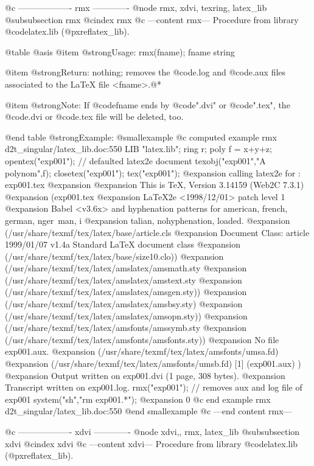 {{{@c ------------------- rmx -------------
@node rmx, xdvi, texring, latex_lib
@subsubsection rmx
@cindex rmx
@c ---content rmx---
Procedure from library @code{latex.lib} (@pxref{latex_lib}).

@table @asis
@item @strong{Usage:}
rmx(fname); fname string

@item @strong{Return:}
nothing; removes the @code{.log} and @code{.aux} files associated to
the LaTeX file <fname>.@*

@item @strong{Note:}
If @code{fname} ends by @code{".dvi"} or @code{".tex"}, the
@code{.dvi} or @code{.tex} file will be deleted, too.

@end table
@strong{Example:}
@smallexample
@c computed example rmx d2t_singular/latex_lib.doc:550 
LIB "latex.lib";
ring r;
poly f = x+y+z;
opentex("exp001");              // defaulted latex2e document
texobj("exp001","A polynom",f);
closetex("exp001");
tex("exp001");
@expansion{} calling  latex2e  for : exp001.tex 
@expansion{} 
@expansion{} This is TeX, Version 3.14159 (Web2C 7.3.1)
@expansion{} (exp001.tex
@expansion{} LaTeX2e <1998/12/01> patch level 1
@expansion{} Babel <v3.6x> and hyphenation patterns for american, french, german, nger\
   man, i
@expansion{} talian, nohyphenation, loaded.
@expansion{} (/usr/share/texmf/tex/latex/base/article.cls
@expansion{} Document Class: article 1999/01/07 v1.4a Standard LaTeX document class
@expansion{} (/usr/share/texmf/tex/latex/base/size10.clo))
@expansion{} (/usr/share/texmf/tex/latex/amslatex/amsmath.sty
@expansion{} (/usr/share/texmf/tex/latex/amslatex/amstext.sty
@expansion{} (/usr/share/texmf/tex/latex/amslatex/amsgen.sty))
@expansion{} (/usr/share/texmf/tex/latex/amslatex/amsbsy.sty)
@expansion{} (/usr/share/texmf/tex/latex/amslatex/amsopn.sty))
@expansion{} (/usr/share/texmf/tex/latex/amsfonts/amssymb.sty
@expansion{} (/usr/share/texmf/tex/latex/amsfonts/amsfonts.sty))
@expansion{} No file exp001.aux.
@expansion{} (/usr/share/texmf/tex/latex/amsfonts/umsa.fd)
@expansion{} (/usr/share/texmf/tex/latex/amsfonts/umsb.fd) [1] (exp001.aux) )
@expansion{} Output written on exp001.dvi (1 page, 308 bytes).
@expansion{} Transcript written on exp001.log.
rmx("exp001");   // removes aux and log file of exp001
system("sh","rm exp001.*");
@expansion{} 0
@c end example rmx d2t_singular/latex_lib.doc:550
@end smallexample
@c ---end content rmx---

@c ------------------- xdvi -------------
@node xdvi,, rmx, latex_lib
@subsubsection xdvi
@cindex xdvi
@c ---content xdvi---
Procedure from library @code{latex.lib} (@pxref{latex_lib}).

}}}
